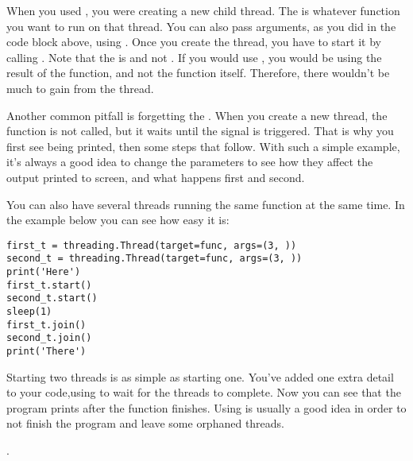 When you used , you were creating a new child thread. The  is whatever function you want to run on that thread. You can also pass arguments, as you did in the code block above, using . Once you create the thread, you have to start it by calling . Note that the  is  and not . If you would use , you would be using the result of the function, and not the function itself. Therefore, there wouldn't be much to gain from the thread.


Another common pitfall is forgetting the . When you create a new thread, the function is not called, but it waits until the  signal is triggered. That is why you first see  being printed, then some steps that follow. With such a simple example, it's always a good idea to change the parameters to see how they affect the output printed to screen, and what happens first and second.

You can also have several threads running the same function at the same time. In the example below you can see how easy it is:

\begin{verbatim}
first_t = threading.Thread(target=func, args=(3, ))
second_t = threading.Thread(target=func, args=(3, ))
print('Here')
first_t.start()
second_t.start()
sleep(1)
first_t.join()
second_t.join()
print('There')
\end{verbatim}

Starting two threads is as simple as starting one. You've added one extra detail to your code,using  to wait for the threads to complete. Now you can see that the program prints  after the function finishes. Using  is usually a good idea in order to not finish the program and leave some orphaned threads.

.

